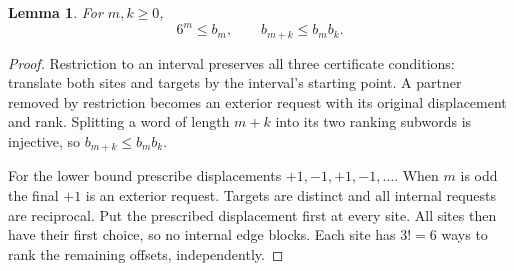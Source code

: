 \documentclass[11pt]{article}
\newtheorem{lemma}[theorem]{Lemma}
\begin{document}
\begin{lemma}\label{lem:restriction}
For $m,k\geq0$,
\[
 6^m\leq b_m,\qquad b_{m+k}\leq b_mb_k.
\]
\end{lemma}
\begin{proof}
Restriction to an interval preserves all three certificate conditions:
translate both sites and targets by the interval's starting point.
A partner removed by restriction becomes an exterior request with its
original displacement and rank. Splitting a word of length $m+k$ into
its two ranking subwords is injective, so $b_{m+k}\leq b_mb_k$.

For the lower bound prescribe displacements $+1,-1,+1,-1,\ldots$.
When $m$ is odd the final $+1$ is an exterior request. Targets are
distinct and all internal requests are reciprocal. Put the prescribed
displacement first at every site. All sites then have their first
choice, so no internal edge blocks. Each site has $3!=6$ ways to rank
the remaining offsets, independently.
\end{proof}
\end{document}
